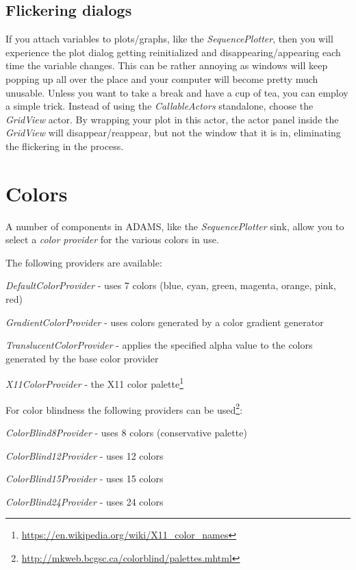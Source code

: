 \subsection{Flickering dialogs}
If you attach variables to plots/graphs, like the \textit{SequencePlotter},
then you will experience the plot dialog getting reinitialized and
disappearing/appearing each time the variable changes. This can be rather
annoying as windows will keep popping up all over the place and your
computer will become pretty much unusable. Unless you want to take a break
and have a cup of tea, you can employ a simple trick. Instead of using the
\textit{CallableActors} standalone, choose the \textit{GridView} actor.
By wrapping your plot in this actor, the actor panel inside the \textit{GridView}
will disappear/reappear, but not the window that it is in, eliminating the
flickering in the process.

\clearpage
\section{Colors}
A number of components in ADAMS, like the \textit{SequencePlotter} sink, allow
you to select a \textit{color provider} for the various colors in use.

\noindent The following providers are available:
\begin{tight_itemize}
  \item \textit{DefaultColorProvider} - uses 7 colors (blue, cyan, green, magenta, orange, pink, red)
  \item \textit{GradientColorProvider} - uses colors generated by a color gradient generator
  \item \textit{TranslucentColorProvider} - applies the specified alpha value to the colors generated by the base color provider
  \item \textit{X11ColorProvider} - the X11 color palette\footnote{\url{https://en.wikipedia.org/wiki/X11_color_names}{}}
\end{tight_itemize}

\noindent For color blindness the following providers can be used\footnote{\url{http://mkweb.bcgsc.ca/colorblind/palettes.mhtml}{}}:
\begin{tight_itemize}
  \item \textit{ColorBlind8Provider} - uses 8 colors (conservative palette)
  \item \textit{ColorBlind12Provider} - uses 12 colors
  \item \textit{ColorBlind15Provider} - uses 15 colors
  \item \textit{ColorBlind24Provider} - uses 24 colors
\end{tight_itemize}


